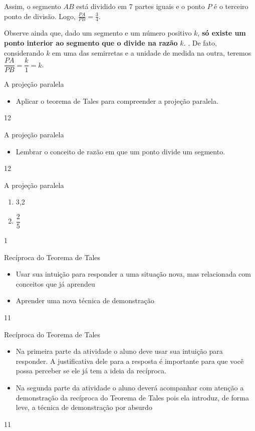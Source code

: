 Assim, o segmento \(AB\) está dividido em 7 partes iguais e o ponto \(P\) é o terceiro ponto de divisão. Logo, \(\frac{PA}{PB}=\frac{3}{4}\).

Observe ainda que, dado um segmento e um número positivo \(k\), \textbf{só existe um ponto interior ao segmento que o divide na razão} \(k\). . De fato, considerando \(k\) em uma das semirretas e a unidade de medida na outra, teremos \(\dfrac{PA}{PB}=\dfrac{k}{1}=k\).
\clearpage
\def\currentcolor{session3}
\begin{objectives}{A projeção paralela}
{
\begin{itemize}
\item {} 
Aplicar o teorema de Tales para compreender a projeção paralela.

\end{itemize}
}{1}{2}
\end{objectives}
\begin{sugestions}{A projeção paralela}
{
\begin{itemize}
\item {} 
Lembrar o conceito de razão em que um ponto divide um segmento.
\end{itemize}
}{1}{2}
\end{sugestions}
\clearmargin
\marginpar{\vspace{.5em}}
\begin{answer}{A projeção paralela}
{
\begin{enumerate}
\item {} 
3,2

\item {} 
\(\dfrac{2}{5}\)

\end{enumerate}
}{1}
\end{answer}
\begin{objectives}{Recíproca do Teorema de Tales}
{
\begin{itemize}
\item {} 
Usar sua intuição para responder a uma situação nova, mas relacionada com conceitos que já aprendeu

\item {} 
Aprender uma nova técnica de demonstração

\end{itemize}
}{1}{1}
\end{objectives}
\begin{sugestions}{Recíproca do Teorema de Tales}
{
\begin{itemize}
\item {} 
Na primeira parte da atividade o aluno deve usar sua intuição para responder. A justificativa dele para a resposta é importante para que você possa perceber se ele já tem a ideia da recíproca.

\item {} 
Na segunda parte da atividade o aluno deverá acompanhar com atenção a demonstração da recíproca do Teorema de Tales pois ela introduz, de forma leve, a técnica de demonstração por absurdo
\end{itemize}
}{1}{1}
\end{sugestions}
